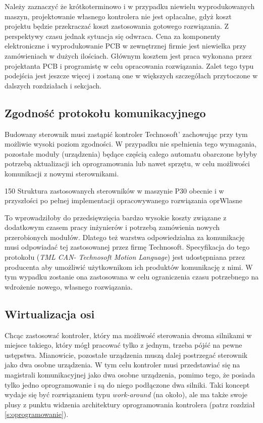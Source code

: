 Należy zaznaczyć że krótkoterminowo i w przypadku niewielu wyprodukowanych maszyn, projektowanie własnego kontrolera nie jest opłacalne, gdyż koszt projektu będzie przekraczać koszt zastosowania gotowego rozwiązania. \linebreak Z perspektywy czasu jednak sytuacja się odwraca. Cena za komponenty elektroniczne i wyprodukowanie PCB w zewnętrznej firmie jest niewielka przy zamówieniach w dużych ilościach. Głównym kosztem jest praca wykonana przez projektanta PCB  i programistę w celu opracowania rozwiązania. Zalet tego typu podejścia jest jeszcze więcej i zostaną one w większych szczegółach przytoczone w dalszych rozdziałach i sekcjach.

\subsection{Zgodność protokołu komunikacyjnego}

Budowany sterownik musi zastąpić kontroler Technosoft' zachowując przy tym możliwie wysoki poziom zgodności. W przypadku nie spełnienia tego wymagania, pozostałe moduły (urządzenia) będące częścią całego automatu obarczone byłyby potrzebą aktualizacji ich oprogramowania lub nawet sprzętu, w celu możliwości komunikacji z nowymi sterownikami. 

	{150}
	{Struktura zastosowanych sterowników w maszynie P30 obecnie i w przyszłości po pełnej implementacji opracowywanego rozwiązania}
	{oprWlasne}

To wprowadziłoby do przedsięwzięcia bardzo wysokie koszty związane z dodatkowym czasem pracy inżynierów i potrzebą zamówienia nowych przerobionych modułów. Dlatego też warstwa odpowiedzialna za komunikację musi odpowiadać tej zastosowanej przez firmę Technosoft. Specyfikacja do tego protokołu ({\it TML CAN- Technosoft Motion Language}) jest udostępniana przez producenta aby umożliwić użytkownikom ich produktów komunikację z nimi. W tym wypadku zostanie ona zastosowana w celu  ograniczenia czasu potrzebnego na wdrożenie nowego, własnego rozwiązania.

\subsection{Wirtualizacja osi}
\label{ss:axis_virtualisation}

Chcąc zastosować kontroler, który ma możliwość sterowania dwoma silnikami \linebreak w miejsce takiego, który mógł pracować tylko z jednym, trzeba pójść na pewne ustępstwa. Mianowicie, pozostałe urządzenia muszą dalej postrzegać sterownik jako dwa osobne urządzenia. W tym celu kontroler musi przedstawiać się na magistrali komunikacyjnej jako dwa osobne urządzenia, pomimo tego, że posiada tylko jedno oprogramowanie i są do niego podłączone dwa silniki. Taki koncept wydaje się być rozwiązaniem typu {\it work-around} (na około), ale ma także swoje plusy z punktu widzenia architektury oprogramowania kontrolera (patrz rozdział \ref{s:oprogramowanie}). \\

